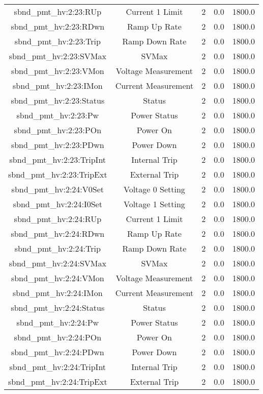 \begin{center}
\begin{longtable}{c | c c c c }
sbnd\_pmt\_hv:2:23:RUp & Current 1 Limit & 2 & 0.0 & 1800.0\\ 
sbnd\_pmt\_hv:2:23:RDwn & Ramp Up Rate & 2 & 0.0 & 1800.0\\ 
sbnd\_pmt\_hv:2:23:Trip & Ramp Down Rate & 2 & 0.0 & 1800.0\\ 
sbnd\_pmt\_hv:2:23:SVMax & SVMax & 2 & 0.0 & 1800.0\\ 
sbnd\_pmt\_hv:2:23:VMon & Voltage Measurement & 2 & 0.0 & 1800.0\\ 
sbnd\_pmt\_hv:2:23:IMon & Current Measurement & 2 & 0.0 & 1800.0\\ 
sbnd\_pmt\_hv:2:23:Status & Status & 2 & 0.0 & 1800.0\\ 
sbnd\_pmt\_hv:2:23:Pw & Power Status & 2 & 0.0 & 1800.0\\ 
sbnd\_pmt\_hv:2:23:POn & Power On & 2 & 0.0 & 1800.0\\ 
sbnd\_pmt\_hv:2:23:PDwn & Power Down & 2 & 0.0 & 1800.0\\ 
sbnd\_pmt\_hv:2:23:TripInt & Internal Trip & 2 & 0.0 & 1800.0\\ 
sbnd\_pmt\_hv:2:23:TripExt & External Trip & 2 & 0.0 & 1800.0\\ 
sbnd\_pmt\_hv:2:24:V0Set & Voltage 0 Setting & 2 & 0.0 & 1800.0\\ 
sbnd\_pmt\_hv:2:24:I0Set & Voltage 1 Setting & 2 & 0.0 & 1800.0\\ 
sbnd\_pmt\_hv:2:24:RUp & Current 1 Limit & 2 & 0.0 & 1800.0\\ 
sbnd\_pmt\_hv:2:24:RDwn & Ramp Up Rate & 2 & 0.0 & 1800.0\\ 
sbnd\_pmt\_hv:2:24:Trip & Ramp Down Rate & 2 & 0.0 & 1800.0\\ 
sbnd\_pmt\_hv:2:24:SVMax & SVMax & 2 & 0.0 & 1800.0\\ 
sbnd\_pmt\_hv:2:24:VMon & Voltage Measurement & 2 & 0.0 & 1800.0\\ 
sbnd\_pmt\_hv:2:24:IMon & Current Measurement & 2 & 0.0 & 1800.0\\ 
sbnd\_pmt\_hv:2:24:Status & Status & 2 & 0.0 & 1800.0\\ 
sbnd\_pmt\_hv:2:24:Pw & Power Status & 2 & 0.0 & 1800.0\\ 
sbnd\_pmt\_hv:2:24:POn & Power On & 2 & 0.0 & 1800.0\\ 
sbnd\_pmt\_hv:2:24:PDwn & Power Down & 2 & 0.0 & 1800.0\\ 
sbnd\_pmt\_hv:2:24:TripInt & Internal Trip & 2 & 0.0 & 1800.0\\ 
sbnd\_pmt\_hv:2:24:TripExt & External Trip & 2 & 0.0 & 1800.0\\ 

\end{longtable}
\end{center}
